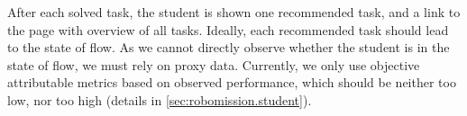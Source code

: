 After each solved task, the student is shown %
one recommended task, and a link to the page with overview of all tasks.
Ideally, each recommended task should lead to the state of flow.
As we cannot directly observe whether the student is in the state of flow,
we must rely on proxy data.
Currently, we only use objective attributable metrics based on observed performance,
which should be neither too low, nor too high
(details in \cref{sec:robomission.student}). %


